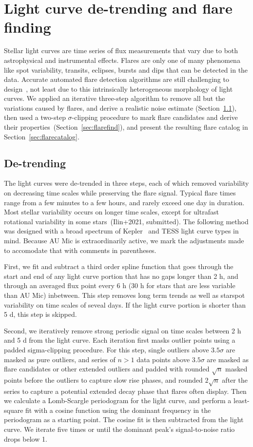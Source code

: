 \documentclass[fleqn,usenatbib,letters]{mnras}%
\begin{document}
\section{Light curve de-trending and flare finding}
\label{sec:detrendfind}
Stellar light curves are time series of flux measurements that vary due to both astrophysical and instrumental effects. Flares are only one of many phenomena like spot variability, transits, eclipses, bursts and dips that can be detected in the data. Accurate automated flare detection algorithms are still challenging to design~\citep{vida2021}, not least due to this intrinsically heterogeneous morphology of light curves. We applied an iterative three-step algorithm to remove all but the variations caused by flares, and derive a realistic noise estimate (Section~\ref{sec:detrend}), then used a two-step $\sigma$-clipping procedure to mark flare candidates and derive their properties~(Section~\ref{sec:flarefind}), and present the resulting flare catalog in Section~\ref{sec:flarecatalog}.

\subsection{De-trending}
\label{sec:detrend}
The light curves were de-trended in three steps, each of which removed variability on decreasing time scales while preserving the flare signal. Typical flare times range from a few minutes to a few hours, and rarely exceed one day in duration. Most stellar variability occurs on longer time scales, except for ultrafast rotational variability in some stars~(Ilin+2021, submitted). The following method was designed with a broad spectrum of Kepler~\citep{borucki2010} and TESS light curve types in mind. Because AU Mic is extraordinarily active, we mark the adjustments made to accomodate that with comments in parentheses. 

First, we fit and subtract a third order spline function that goes through the start and end of any light curve portion that has no gaps longer than 2 h, and through an averaged flux point every 6 h (30 h for stars that are less variable than AU Mic) inbetween. This step removes long term trends as well as starspot variability on time scales of seveal days. If the light curve portion is shorter than 5 d, this step is skipped. 

Second, we iteratively remove strong periodic signal on time scales between 2 h and 5 d from the light curve. Each iteration first masks outlier points using a padded sigma-clipping procedure. For this step, single outliers above $3.5 \sigma$ are masked as pure outliers, and series of $n>1$ data points above $3.5 \sigma$ are masked as flare candidates or other extended outliers and padded with rounded $\sqrt{n}$ masked points before the outliers to capture slow rise phases, and rounded $2\sqrt{n}$ after the series to capture a potential extended decay phase that flares often display. Then we calculate a Lomb-Scargle periodogram for the light curve, and perform a least-square fit with a cosine function using the dominant frequency in the periodogram as a starting point. The cosine fit is then subtracted from the light curve. We iterate five times or until the dominant peak's signal-to-noise ratio drops below 1. 
\end{document}
